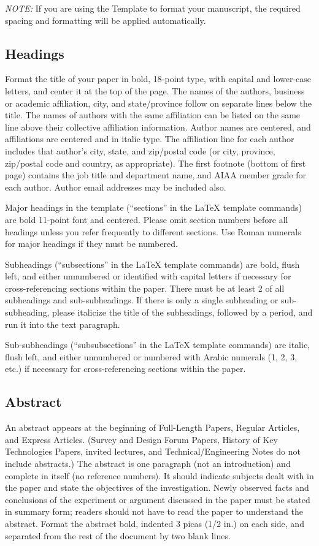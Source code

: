\documentclass[journal]{new-aiaa}
\begin{document}
\emph{NOTE:} If you are using the Template to format your manuscript, the required spacing and formatting will be applied automatically.


\subsection{Headings}
Format the title of your paper in bold, 18-point type, with capital and lower-case letters, and center it at the top of the page. The names of the authors, business or academic affiliation, city, and state/province follow on separate lines below the title. The names of authors with the same affiliation can be listed on the same line above their collective affiliation information. Author names are centered, and affiliations are centered and in italic type. The affiliation line for each author includes that author’s city, state, and zip/postal code (or city, province, zip/postal code and country, as appropriate). The first footnote (bottom of first page) contains the job title and department name, and AIAA member grade for each author. Author email addresses may be included also.

Major headings in the template (``sections'' in the \LaTeX{} template commands) are bold 11-point font and centered. Please omit section numbers before all headings unless you refer frequently to different sections. Use Roman numerals for major headings if they must be numbered.

Subheadings (``subsections'' in the \LaTeX{} template commands) are bold, flush left, and either unnumbered or identified with capital letters if necessary for cross-referencing sections within the paper. There must be at least 2 of all subheadings and sub-subheadings. If there is only a single subheading or sub-subheading, please italicize the title of the subheadings, followed by a period, and run it into the text paragraph. 

Sub-subheadings (``subsubsections'' in the \LaTeX{} template commands) are italic, flush left, and either unnumbered or numbered with Arabic numerals (1, 2, 3, etc.) if necessary for cross-referencing sections within the paper.


\subsection{Abstract}
An abstract appears at the beginning of Full-Length Papers, Regular Articles, and Express Articles. (Survey and Design Forum Papers, History of Key Technologies Papers, invited lectures, and Technical/Engineering Notes do not include abstracts.) The abstract is one paragraph (not an introduction) and complete in itself (no reference numbers). It should indicate subjects dealt with in the paper and state the objectives of the investigation. Newly observed facts and conclusions of the experiment or argument discussed in the paper must be stated in summary form; readers should not have to read the paper to understand the abstract. Format the abstract bold, indented 3 picas (1/2 in.) on each side, and separated from the rest of the document by two blank lines.
\end{document}
